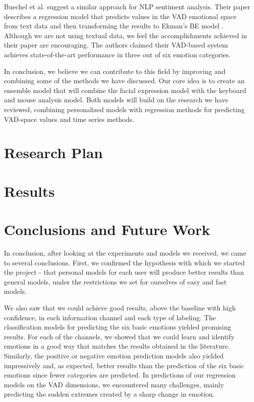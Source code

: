 \documentclass{article}
\begin{document}
Buechel et al. \cite{emotion_regression} suggest a similar approach for NLP sentiment analysis. 
Their paper describes a regression model that predicts values in the VAD emotional 
space \cite{VAD_model} from text data and then transforming the results to Ekman's BE model \cite{Ekman_Theory}. 
Although we are not using textual data, we feel the accomplishments achieved in their 
paper are encouraging. The authors claimed their VAD-based system achieves state-of-the-art 
performance in three out of six emotion categories.
\par

In conclusion, we believe we can contribute to this field by improving and combining some of the 
methods we have discussed. Our core idea is to create an ensemble model that will combine the 
facial expression model with the keyboard and mouse analysis model. 
Both models will build on the research we have reviewed, combining personalized models with 
regression methods for predicting VAD-space values and time series methods.

\newpage

\section{Research Plan}


\newpage

\section{Results}


\section{Conclusions and Future Work}
In conclusion, after looking at the experiments and models we received, we came to several conclusions. 
First, we confirmed the hypothesis with which we started the project - that personal models for each user will produce better results than general models,
under the restrictions we set for ourselves of easy and fast models.

We also saw that we could achieve good results, above the baseline with high confidence, 
in each information channel and each type of labeling. The classification models for predicting the six basic emotions yielded promising results. 
For each of the channels, we showed that we could learn and identify emotions in a good way that matches the results obtained in the literature. 
Similarly, the positive or negative emotion prediction models also yielded impressively and, as expected, better results than the prediction of 
the six basic emotions since fewer categories are predicted. 
In predictions of our regression models on the VAD dimensions, we encountered many challenges, 
mainly predicting the sudden extremes created by a sharp change in emotion. 
\end{document}
